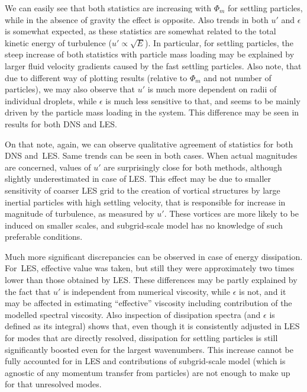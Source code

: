 \documentclass{pracamgren}
\begin{document}
We can easily see that both statistics are increasing with $\Phi_m$ for settling particles, while in the absence of gravity the effect is opposite.
Also trends in both $u'$ and $\epsilon$ is somewhat expected, as these statistics are somewhat related to the total kinetic energy of turbulence ($u' \propto \sqrt{E}$).
In particular, for settling particles, the steep increase of both statistics with particle mass loading may be explained by larger fluid velocity gradients caused by the fast settling particles.
Also note, that due to different way of plotting results (relative to $\Phi_m$ and not number of particles), we may also observe that $u'$ is much more dependent on radii of individual droplets, while $\epsilon$ is much less sensitive to that, and seems to be mainly driven by the particle mass loading in the system.
This difference may be seen in results for both DNS and LES.

On that note, again, we can observe qualitative agreement of statistics for both DNS and~LES.
Same trends can be seen in both cases.
When actual magnitudes are concerned, values of $u'$ are surprisingly close for both methods, although slightly underestimated in case of LES.
This effect may be due to smaller sensitivity of coarser LES grid to the creation of vortical structures by large inertial particles with high settling velocity, that is responsible for increase in magnitude of turbulence, as measured by $u'$.
These vortices are more likely to be induced on smaller scales, and subgrid-scale model has no knowledge of such preferable conditions. 
 
Much more significant discrepancies can be observed in case of energy dissipation.
For~LES, effective value was taken, but still they were approximately two times lower than those obtained by LES.
These differences may be partly explained by the fact that $u'$ is independent from numerical viscosity, while $\epsilon$ is not, and it may be affected in estimating ``effective'' viscosity including contribution of the modelled spectral viscosity.
Also inspection of dissipation spectra (and $\epsilon$ is defined as its integral) shows that, even though it is consistently adjusted in LES for modes that are directly resolved, 
dissipation for settling particles is still significantly boosted even for the largest wavenumbers.
This increase cannot be fully accounted for in LES and contributions of subgrid-scale model (which is agnostic of any momentum transfer from particles) are not enough to make up for that unresolved modes.
\end{document}
